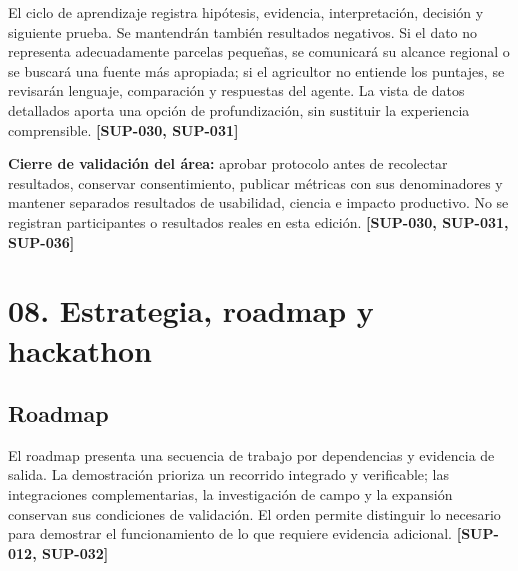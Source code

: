 \documentclass[10pt,a4paper]{article}
\begin{document}
El ciclo de aprendizaje registra hipótesis, evidencia, interpretación, decisión y siguiente prueba. Se mantendrán también resultados negativos. Si el dato no representa adecuadamente parcelas pequeñas, se comunicará su alcance regional o se buscará una fuente más apropiada; si el agricultor no entiende los puntajes, se revisarán lenguaje, comparación y respuestas del agente. La vista de datos detallados aporta una opción de profundización, sin sustituir la experiencia comprensible. \textbf{[SUP-030, SUP-031]}


\textbf{Cierre de validación del área:} aprobar protocolo antes de recolectar resultados, conservar consentimiento, publicar métricas con sus denominadores y mantener separados resultados de usabilidad, ciencia e impacto productivo. No se registran participantes o resultados reales en esta edición. \textbf{[SUP-030, SUP-031, SUP-036]}


\clearpage\section{08. Estrategia, roadmap y hackathon}\label{08-estrategia-roadmap-y-hackathon}

\subsection{Roadmap}

El roadmap presenta una secuencia de trabajo por dependencias y evidencia de salida. La demostración prioriza un recorrido integrado y verificable; las integraciones complementarias, la investigación de campo y la expansión conservan sus condiciones de validación. El orden permite distinguir lo necesario para demostrar el funcionamiento de lo que requiere evidencia adicional. \textbf{[SUP-012, SUP-032]}
\end{document}
